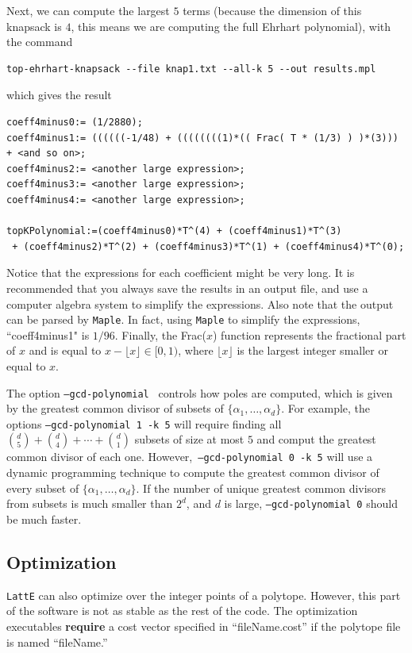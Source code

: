 \documentclass{article}
\newcommand{\latte}{{\tt LattE}\xspace}
\newcommand{\maple}{{\tt Maple}\xspace}
\begin{document}
Next, we can compute the largest $5$ terms (because the dimension of this knapsack is $4$, this means we are computing the full Ehrhart polynomial), with the command
\begin{verbatim}
top-ehrhart-knapsack --file knap1.txt --all-k 5 --out results.mpl
\end{verbatim}
which gives the result
\begin{verbatim}
coeff4minus0:= (1/2880);
coeff4minus1:= ((((((-1/48) + ((((((((1)*(( Frac( T * (1/3) ) )*(3))) + <and so on>;
coeff4minus2:= <another large expression>;
coeff4minus3:= <another large expression>;
coeff4minus4:= <another large expression>;

topKPolynomial:=(coeff4minus0)*T^(4) + (coeff4minus1)*T^(3) 
 + (coeff4minus2)*T^(2) + (coeff4minus3)*T^(1) + (coeff4minus4)*T^(0);
\end{verbatim}
  
Notice that the expressions for each coefficient might be very long. It is recommended that you always save the results in an output file, and use a computer algebra system to simplify the expressions. Also note that the output can be parsed by \maple. In fact, using \maple to simplify the expressions, ``coeff4minus1" is $1/96$. Finally, the Frac($x$) function represents the fractional part of $x$ and is equal to $x - \lfloor x \rfloor \in [0,1)$, where $\lfloor x \rfloor$ is  the largest integer smaller or equal to $x$.

The option {\tt --gcd-polynomial } controls how poles are computed, which is given by the greatest common divisor of subsets of $\{\alpha_1 , \dots, \alpha_d\}$. For example, the options {\tt --gcd-polynomial 1 -k 5} will require finding all $\binom{d}{5}+\binom{d}{4}+\cdots+\binom{d}{1}$ subsets of size at most $5$ and comput the greatest common divisor of each one. However,~{\tt --gcd-polynomial 0 -k 5} will use a dynamic programming technique to compute the greatest common divisor of every subset of $\{\alpha_1 , \dots, \alpha_d\}$. If the number of unique greatest common divisors from subsets is much smaller than $2^d$, and $d$ is large, {\tt --gcd-polynomial 0} should be much faster. 


\subsection{Optimization}


\latte can also optimize over the integer points of a polytope. However, this part of the software is not as stable as the rest of the code. The optimization executables {\bf require} a cost vector specified in ``fileName.cost'' if the polytope file is named ``fileName.''
\end{document}
